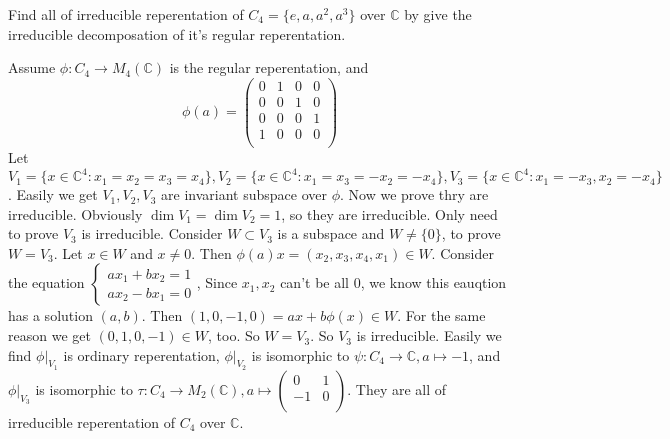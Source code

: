 \documentclass{ctexart}
\newif\ifpreface
\begin{document}
\large
\setlength{\baselineskip}{1.2em}
\ifpreface
	
	\newgeometry{left=2cm,right=2cm,top=2cm,bottom=2cm}
\else
	\maketitle
\fi
\begin{problem}
Find all of irreducible reperentation of \(C_4=\{e,a,a^2,a^3\}\) over \(\mathbb{C}\) by give the irreducible decomposation of it's regular reperentation.
\end{problem}

\begin{solution}
	Assume \(\phi:C_4 \to M_4(\mathbb{C})\) is the regular reperentation, and
	\[
		\phi(a)=\left(\begin{array}{cccc}
				0 & 1 & 0 & 0 \\
				0 & 0 & 1 & 0 \\
				0 & 0 & 0 & 1 \\
				1 & 0 & 0 & 0 \\
			\end{array}\right)
	\]
	Let \(V_1=\{x \in \mathbb{C}^4:x_1=x_2=x_3=x_4\}, V_2=\{x \in \mathbb{C}^4:x_1=x_3=-x_2=-x_4\},V_3=\{x \in \mathbb{C}^4:x_1=-x_3,x_2=-x_4\}\).
	Easily we get \(V_1,V_2,V_3\) are invariant subspace over \(\phi\). Now we prove thry are irreducible.
	Obviously \(\dim V_1=\dim V_2=1\), so they are irreducible. Only need to prove \(V_3\) is irreducible.
	Consider \(W \subset V_3\) is a subspace and \(W \neq \{0\}\), to prove \(W=V_3\).
	Let \(x \in W\) and \(x \neq 0\). Then \(\phi(a)x=(x_2,x_3,x_4,x_1) \in W\).
	Consider the equation \(\begin{cases}
		a x_1+b x_2=1 \\
		a x_2 - b x_1 =0
	\end{cases}\), Since \(x_1,x_2\) can't be all \(0\), we know this eauqtion has a solution \((a,b)\).
	Then \((1,0,-1,0)=ax+b \phi(x) \in W\). For the same reason we get \((0,1,0,-1) \in W\), too.
	So \(W=V_3\). So \(V_3\) is irreducible.
	Easily we find \(\phi|_{V_1}\) is ordinary reperentation,
	\(\phi|_{V_2}\) is isomorphic to \(\psi:C_4 \to \mathbb{C}, a \mapsto -1\),
	and \(\phi|_{V_3}\) is isomorphic to \(\tau:C_4 \to M_2(\mathbb{C}), a \mapsto \begin{pmatrix}
		0  & 1 \\
		-1 & 0 \\
	\end{pmatrix}\).
	They are all of irreducible reperentation of \(C_4\) over \(\mathbb{C}\).
\end{solution}
\end{document}
